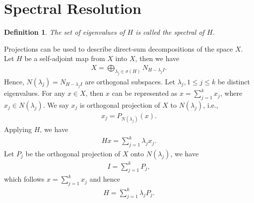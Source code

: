 \documentclass[11pt]{book}
\newtheorem{definition}{Definition}[chapter]
\theoremstyle{definition}
\numberwithin{equation}{chapter}
\begin{document}
\medskip

\section{Spectral Resolution}

\begin{definition}
The set of eigenvalues of $H$ is called the spectral of $H$.
\end{definition}

\medskip

Projections can be used to describe direct-sum decompositions of the space $X$\cite{33}. Let $H$ be a self-adjoint map from $X$ into $X$, then we have 
\begin{align*}
    X = \bigoplus_{\lambda_j \in \sigma(H)}N_{H - \lambda_j I}.
\end{align*}
Hence, $N(\lambda_j) = N_{H - \lambda_j I}$ are orthogonal subspaces. Let $\lambda_j, 1\leq j\leq k$ be distinct eigenvalues. For any $x\in X$, then $x$ can be represented as $x = \sum^k_{j=1}x_j$, where $x_j\in N(\lambda_j)$. We say $x_j$ is orthogonal projection of $X$ to $N(\lambda_j)$, i.e., 
\begin{align*}
    x_j = P_{N(\lambda_j)}(x).
\end{align*}
Applying $H$, we have
\begin{align*}
    Hx = \sum^k_{j=1} \lambda_j x_j.
\end{align*}
Let $P_j$ be the orthogonal projection of $X$ onto $N(\lambda_j)$, we have
\begin{align*}
    I = \sum^k_{j=1} P_j,
\end{align*}
which follows $x = \sum^k_{j=1}x_j$ and hence 
\begin{align*}
    H = \sum^k_{j=1} \lambda_j P_j.
\end{align*}

\medskip
\end{document}
